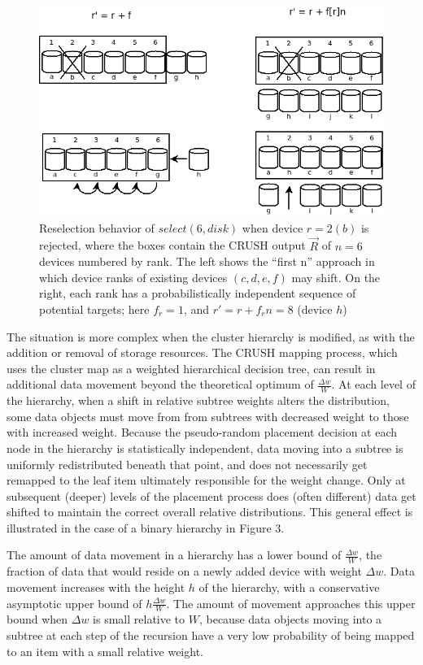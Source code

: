 \documentclass[12pt,a4paper]{report}
\begin{document}
\begin{figure}[h!]
	\includegraphics[scale=0.60]{reselection_behavior.png}
\caption{Reselection behavior of $select(6,disk)$ when device $r = 2(b)$ is
rejected, where the boxes contain the CRUSH output $\vec{R}$ of $n = 6$ devices
numbered by rank. The left shows the ``first n'' approach in which device ranks
of existing devices $(c,d,e,f)$ may shift. On the right, each rank has a
probabilistically independent sequence of potential targets; here $f_r = 1$,
and $r' = r + f_rn = 8$ (device $h$) }
	\label{fig:reselection_behavior}
\end{figure}

The situation is more complex when the cluster hierarchy is modified, as with
the addition or removal of storage resources. The CRUSH mapping process, which
uses the cluster map as a weighted hierarchical decision tree, can result in
additional data movement beyond the theoretical optimum of $\frac{\Delta
w}{W}$. At each level of the hierarchy, when a shift in relative subtree
weights alters the distribution, some data objects must move from from subtrees
with decreased weight to those with increased weight. Because the pseudo-random
placement decision at each node in the hierarchy is statistically independent,
data moving into a subtree is uniformly redistributed beneath that point, and
does not necessarily get remapped to the leaf item ultimately responsible for
the weight change. Only at subsequent (deeper) levels of the placement process
does (often different) data get shifted to maintain the correct overall
relative distributions. This general effect is illustrated in the case of a
binary hierarchy in Figure 3.

The amount of data movement in a hierarchy has a lower bound  of $\frac{\Delta
w}{W}$, the fraction of data that would reside on a newly added device with
weight $\Delta w$. Data movement increases with the height $h$ of the
hierarchy, with a conservative asymptotic upper bound of $h \frac{\Delta
w}{W}$. The amount of movement approaches this upper bound when $\Delta w$ is
small relative to $W$, because data objects moving into a subtree at each step
of the recursion have a very low probability of being mapped to an item with a
small relative weight.
\end{document}
